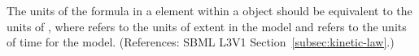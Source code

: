 The units of the formula in a  element within a \KineticLaw
object should be equivalent to the units of ,
where  refers to the units of extent in the model and
 refers to the units of time for the model.  (References:
SBML L3V1 Section~\ref{subsec:kinetic-law}.)
